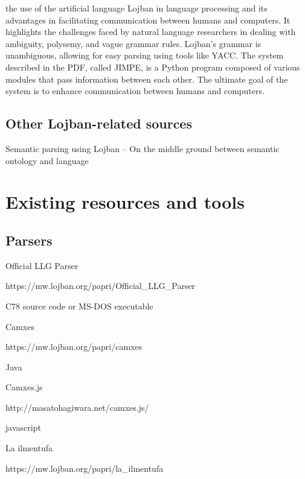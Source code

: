 the use of the artificial language Lojban in language processing and its advantages in facilitating communication between humans and computers. It highlights the challenges faced by natural language researchers in dealing with ambiguity, polysemy, and vague grammar rules. Lojban's grammar is unambiguous, allowing for easy parsing using tools like YACC. The system described in the PDF, called JIMPE, is a Python program composed of various modules that pass information between each other. The ultimate goal of the system is to enhance communication between humans and computers.

\subsection{Other Lojban-related sources}

Semantic parsing using Lojban – On the middle ground between semantic ontology and language

\section{Existing resources and tools}

\subsection{Parsers}

Official LLG Parser

https://mw.lojban.org/papri/Official\_LLG\_Parser

C78 source code
or
MS-DOS executable


Camxes

https://mw.lojban.org/papri/camxes

Java

Camxes.js

http://masatohagiwara.net/camxes.js/

javascript

La ilmentufa

https://mw.lojban.org/papri/la\_ilmentufa

